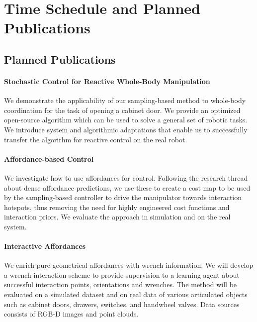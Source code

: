 \section{Time Schedule and Planned Publications}
\label{sec:time_schedule}


\subsection{Planned Publications}
\paragraph{Stochastic Control for Reactive Whole-Body Manipulation} We demonstrate the applicability of our sampling-based method to whole-body coordination for the task of opening a cabinet door. We provide an optimized open-source algorithm which can be used to solve a general set of robotic tasks. We introduce system and algorithmic adaptations that enable us to successfully transfer the algorithm for reactive control on the real robot.

\paragraph{Affordance-based Control} We investigate how to use affordances for control. Following the research thread about dense affordance predictions, we use these to create a cost map to be used by the sampling-based controller to drive the manipulator towards interaction hotspots, thus removing the need for highly engineered cost functions and interaction priors. We evaluate the approach in simulation and on the real system. 

\paragraph{Interactive Affordances} We enrich pure geometrical affordances with wrench information. We will develop a wrench interaction scheme to provide supervision to a learning agent about successful interaction points, orientations and wrenches. The method will be evaluated on a simulated dataset and on real data of various articulated objects such as cabinet doors, drawers, switches, and handwheel valves. Data sources consists of RGB-D images and point clouds. 


